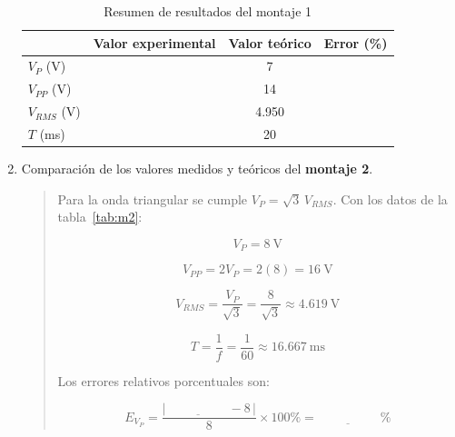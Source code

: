 \documentclass{article}
\newcommand{\vacio}[1][2cm]{\underline{\hspace{#1}}}
\begin{document}
\begin{enumerate}
        \begin{table}[ht!]
            \centering
            \begin{tabular}{lccc}
                \toprule
                                & Valor experimental & Valor teórico & Error (\%)    \\
                \midrule
                $V_P$ (V)       & \vacio[1.8cm]      & 7             & \vacio[1.5cm] \\
                $V_{PP}$ (V)    & \vacio[1.8cm]      & 14            & \vacio[1.5cm] \\
                $V_{RMS}$ (V)   & \vacio[1.8cm]      & 4.950         & \vacio[1.5cm] \\
                $T$ (ms)        & \vacio[1.8cm]      & 20            & \vacio[1.5cm] \\
                \bottomrule
            \end{tabular}
            \caption{Resumen de resultados del montaje 1}\label{tab:res-m1}
        \end{table}

        \item Comparación de los valores medidos y teóricos del \textbf{montaje 2}.

        \begin{quote}
            Para la onda triangular se cumple $V_P = \sqrt{3}\,V_{RMS}$. Con los datos de la tabla~\ref{tab:m2}:

            \[
                V_P = \SI{8}{\volt}
            \]

            \[
                V_{PP} = 2V_P = 2(8) = \SI{16}{\volt}
            \]

            \[
                V_{RMS} = \frac{V_P}{\sqrt{3}} = \frac{8}{\sqrt{3}} \approx \SI{4.619}{\volt}
            \]

            \[
                T = \frac{1}{f} = \frac{1}{60} \approx \SI{16.667}{\milli\second}
            \]

            Los errores relativos porcentuales son:

            \[
                E_{V_P} = \frac{\left|\,\vacio - 8\,\right|}{8} \times 100\% = \vacio\,\%
            \]


\end{quote}
\end{enumerate}
\end{document}
